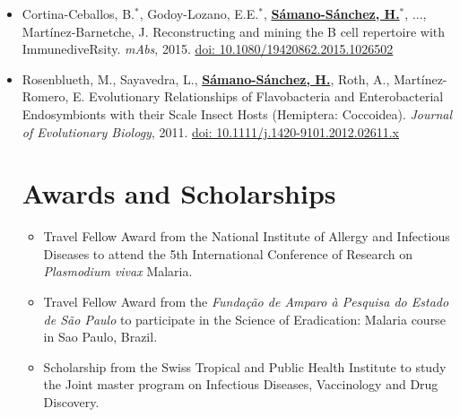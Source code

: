 \documentclass[11pt,a4paper,sans]{moderncv} %
\begin{document}
\begin{itemize}
\item Cortina-Ceballos, B.$^{\ast}$, Godoy-Lozano, E.E.$^{\ast}$, \textbf{\underline{Sámano-Sánchez, H.}}$^{\ast}$, ..., Martínez-Barnetche, J. Reconstructing and mining the B cell repertoire with ImmunediveRsity. \textit{mAbs}, 2015. \href{https://doi.org/10.1080/19420862.2015.1026502}{doi: 10.1080/19420862.2015.1026502}
\item Rosenblueth, M., Sayavedra, L., \textbf{\underline{Sámano-Sánchez, H.}}, Roth, A., Martínez-Romero, E. Evolutionary Relationships of Flavobacteria and Enterobacterial Endosymbionts with their Scale Insect Hosts (Hemiptera: Coccoidea). \textit{Journal of Evolutionary Biology}, 2011. \href{https://doi.org/10.1111/j.1420-9101.2012.02611.x}{doi: 10.1111/j.1420-9101.2012.02611.x}

\section{Awards and Scholarships}
\begin{itemize}
\item Travel Fellow Award from the National Institute of Allergy and Infectious Diseases to attend the 5th International Conference of Research on \textit{Plasmodium vivax} Malaria.
\item Travel Fellow Award from the \textit{Fundação de Amparo à Pesquisa do Estado de São Paulo} to participate in the Science of Eradication: Malaria course in Sao Paulo, Brazil.
\item Scholarship from the Swiss Tropical and Public Health Institute to study the Joint master program on Infectious Diseases, Vaccinology and Drug Discovery.\\
\end{itemize}


\end{itemize}
\end{document}
